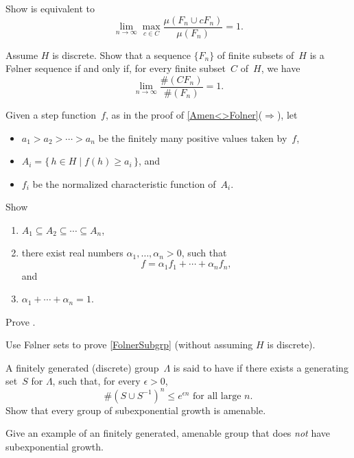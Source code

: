 \begin{exercises}
\item \label{Folner<>ratio}
Show  is equivalent to
	 $$ \lim_{n \to \infty} \max_{c \in C} \frac{ \mu( F_n \cup c F_n) }{ \mu(F_n) } = 1 .$$

\item \label{Folner<>CF}
Assume $H$ is discrete. Show that a sequence $\{F_n\}$ of finite subsets of~$H$ is a F\o lner sequence if and only if, for every finite subset~$C$ of~$H$, we have
	 $$ \lim_{n \to \infty} \frac{ \#( C F_n ) }{ \#(F_n) } = 1 .$$

\item \label{StepFuncIsSumEx}
Given a step function~$f$, as in the proof of \cref{Amen<>Folner}($\Rightarrow$), let 
	\begin{itemize}
	\item $a_1 > a_2 > \cdots > a_n$ be the finitely many positive values taken by~$f$,
	\item $A_i = \{\, h \in H \mid f(h) \ge a_i \,\}$,
	and
	\item $f_i$ be the normalized characteristic function of~$A_i$.
	\end{itemize}
Show 
	\begin{enumerate}
	\item $A_1 \subseteq A_2 \subseteq \cdots \subseteq A_n$,
	\item there exist real numbers $\alpha_1,\ldots,\alpha_n > 0$, such that 
	$$ f = \alpha_1 f_1 + \cdots + \alpha_n f_n ,$$
	and
	\item $\alpha_1 + \cdots + \alpha_n = 1$.
	\end{enumerate}

\item \label{cAiDisjAjEx}
Prove .

\item 
\harder
Use F\o lner sets to prove \cref{FolnerSubgrp} (without assuming $H$ is discrete).

\item A finitely generated (discrete) group~$\Lambda$ is said to have  if there exists a generating set~$S$ for $\Lambda$, such that, for every $\epsilon > 0$, 
	$$ \text{$\# (S \cup S^{-1})^n \le e^{\epsilon n}$ for all large~$n$.} $$
Show that every group of subexponential growth is amenable.

\item Give an example of an finitely generated, amenable group that does \emph{not} have subexponential growth.

\end{exercises}





